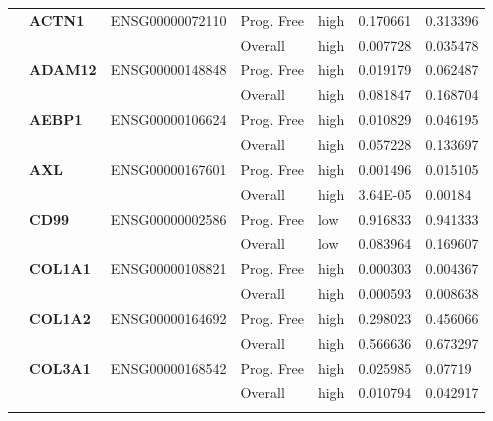 \begin{spacing}{1}
{\begin{longtable}{%
            |>{\bfseries}p{2cm}|
            >{\bfseries}p{1.9cm}|
            >{\tiny}p{1.9cm}|
            p{2cm}|
            p{2cm}|
            p{1.5cm}|
            p{1.5cm}|
            }
            \multirow{2}{3cm}{True}
             & ACTN1    & ENSG00000072110 & Prog. Free & high & 0.170661 & 0.313396 \\
            \hhline{~~~----}
             &          &                 & Overall    & high & 0.007728 & 0.035478 \\
            \hhline{~======}
             & ADAM12   & ENSG00000148848 & Prog. Free & high & 0.019179 & 0.062487 \\
            \hhline{~~~----}
             &          &                 & Overall    & high & 0.081847 & 0.168704 \\
            \hhline{~======}
             & AEBP1    & ENSG00000106624 & Prog. Free & high & 0.010829 & 0.046195 \\
            \hhline{~~~----}
             &          &                 & Overall    & high & 0.057228 & 0.133697 \\
            \hhline{~======}
             & AXL      & ENSG00000167601 & Prog. Free & high & 0.001496 & 0.015105 \\
            \hhline{~~~----}
             &          &                 & Overall    & high & 3.64E-05 & 0.00184  \\
            \hhline{~======}
             & CD99     & ENSG00000002586 & Prog. Free & low  & 0.916833 & 0.941333 \\
            \hhline{~~~----}
             &          &                 & Overall    & low  & 0.083964 & 0.169607 \\
            \hhline{~======}
             & COL1A1   & ENSG00000108821 & Prog. Free & high & 0.000303 & 0.004367 \\
            \hhline{~~~----}
             &          &                 & Overall    & high & 0.000593 & 0.008638 \\
            \hhline{~======}
             & COL1A2   & ENSG00000164692 & Prog. Free & high & 0.298023 & 0.456066 \\
            \hhline{~~~----}
             &          &                 & Overall    & high & 0.566636 & 0.673297 \\
            \hhline{~======}
             & COL3A1   & ENSG00000168542 & Prog. Free & high & 0.025985 & 0.07719  \\
            \hhline{~~~----}
             &          &                 & Overall    & high & 0.010794 & 0.042917 \\
            \hhline{~======}

\end{longtable}}
\end{spacing}
